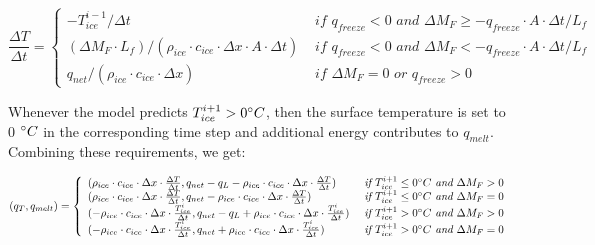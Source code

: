 \documentclass[utf8]{frontiersSCNS} %
\begin{document}
\begin{equation} \frac{\Delta T}{\Delta t} = \left\{ \begin{array}{ll} -T_{ice}^{i-1}/\Delta t & \textit{ if }
     q_{freeze} < 0 \textit{ and } \Delta M_{F} \geq -q_{freeze}\cdot A \cdot \Delta t/L_f  \\ (\Delta M_{F}
    \cdot L_f )/(\rho_{ice} \cdot c_{ice} \cdot  \Delta x \cdot A \cdot \Delta t) & \textit{ if }  q_{freeze}< 0
    \textit{ and } \Delta M_{F} < -q_{freeze}\cdot A \cdot \Delta t/L_f  \\ q_{net}/ (\rho_{ice}\cdot c_{ice}
    \cdot \Delta x)& \textit{ if } \Delta M_{F} = 0 \textit{ or }  q_{freeze}> 0
         
    \end{array} \right.  \label{eqn:T} \end{equation}

Whenever the model predicts $T_{ice}^{i+1} > 0 \degree C$, then the surface temperature is set to 0 $\degree C$ in the
corresponding time step and additional energy contributes to $q_{melt}$. Combining these requirements, we get:

\begin{equation} (q_{T}, q_{melt}) = \left\{ \begin{array}{ll} ( \rho_{ice} \cdot c_{ice} \cdot  \Delta x \cdot
    \frac{\Delta T}{\Delta t}, q_{net}-q_{L}-\rho_{ice} \cdot c_{ice} \cdot  \Delta x \cdot \frac{\Delta T}{\Delta t})
    & \textit{ if } T_{ice}^{i+1}\leq 0 \degree C \textit{ and } \Delta M_{F} > 0\\ ( \rho_{ice} \cdot c_{ice} \cdot  \Delta x
    \cdot \frac{\Delta T}{\Delta t}, q_{net}-\rho_{ice} \cdot c_{ice} \cdot  \Delta x \cdot \frac{\Delta T}{\Delta t})
    & \textit{ if } T_{ice}^{i+1}\leq 0 \degree C \textit{ and } \Delta M_{F} = 0\\
        ( -\rho_{ice} \cdot c_{ice} \cdot  \Delta x \cdot \frac{T_{ice}^{i}}{\Delta t}, q_{net}-q_{L}+\rho_{ice} \cdot
    c_{ice} \cdot \Delta x \cdot \frac{T_{ice}^{i}}{\Delta t}) & \textit{ if } T_{ice}^{i+1}> 0 \degree C \textit{ and } \Delta
    M_{F} > 0\\ ( -\rho_{ice} \cdot c_{ice} \cdot  \Delta x \cdot \frac{T_{ice}^{i}}{\Delta t}, q_{net}+\rho_{ice}
    \cdot c_{ice} \cdot  \Delta x \cdot \frac{T_{ice}^{i}}{\Delta t}) & \textit{ if } T_{ice}^{i+1}> 0 \degree C \textit{ and }
\Delta M_{F} = 0\\ \end{array} \right.  \label{eqn:qt} \end{equation}
\end{document}
